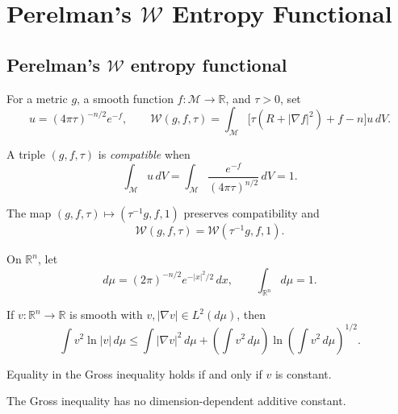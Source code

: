 \chapter{Perelman's \texorpdfstring{$\mathcal W$}{W} Entropy Functional}

\section{Perelman's \texorpdfstring{$\mathcal W$}{W} entropy functional}

For a metric $g$, a smooth function $f:\mathcal M\to\mathbb R$, and
$\tau>0$, set
\[
u=(4\pi\tau)^{-n/2}e^{-f},\qquad
\mathcal W(g,f,\tau)=\int_{\mathcal M}
\bigl[\tau(R+|\nabla f|^2)+f-n\bigr]u\,dV.
\]

\begin{definition}
\label{topping-ch8-compatible-arguments}
A triple $(g,f,\tau)$ is \emph{compatible} when
\[
\int_{\mathcal M}u\,dV
=\int_{\mathcal M}\frac{e^{-f}}{(4\pi\tau)^{n/2}}\,dV=1.
\]
\end{definition}

\begin{proposition}
\label{topping-ch8-scale-invariance}

The map $(g,f,\tau)\mapsto(\tau^{-1}g,f,1)$ preserves compatibility and
\[
\mathcal W(g,f,\tau)=\mathcal W(\tau^{-1}g,f,1).
\]
\end{proposition}

On $\mathbb R^n$, let
\[
d\mu=(2\pi)^{-n/2}e^{-|x|^2/2}\,dx,
\qquad \int_{\mathbb R^n}d\mu=1.
\]

\begin{theorem}
\label{topping-ch8-gross-log-sobolev}
If $v:\mathbb R^n\to\mathbb R$ is smooth with
$v,|\nabla v|\in L^2(d\mu)$, then
\[
\int v^2\ln|v|\,d\mu
\leq \int|\nabla v|^2\,d\mu
+\left(\int v^2\,d\mu\right)
 \ln\left(\int v^2\,d\mu\right)^{1/2}.
\]
\end{theorem}

\begin{remark}
\label{topping-ch8-gross-equality}
Equality in the Gross inequality holds if and only if $v$ is constant.
\end{remark}

\begin{remark}
\label{topping-ch8-gross-no-dimension-constant}
The Gross inequality has no dimension-dependent additive constant.
\end{remark}

